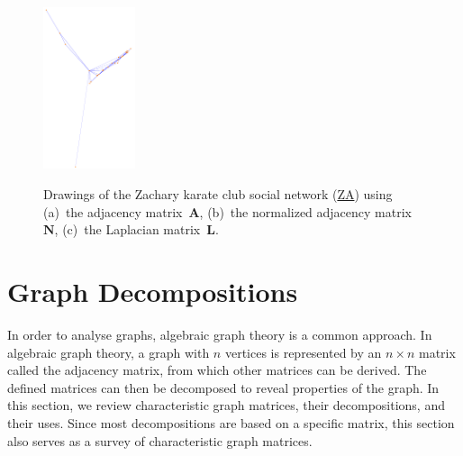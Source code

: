 \documentclass{article}
\newcommand{\wFour}{0.24\textwidth}
\begin{document}
\begin{figure}
{    \includegraphics[width=\wFour]{plot/map.ax.lap.ucidata-zachary}}
  \caption{ Drawings of the Zachary karate club social network
    (\href{http://konect.uni-koblenz.de/networks/ucidata-zachary}{\textsf{ZA}})
    using (a)~the adjacency matrix~$\mathbf A$, (b)~the normalized
    adjacency matrix~$\mathbf N$, (c)~the Laplacian matrix~$\mathbf L$.
    \label{fig:map.ax}
  }
\end{figure}

\section{Graph Decompositions}
\label{sec:matrix}
In order to analyse graphs, algebraic graph theory is a common
approach.  In algebraic graph theory, a graph with $n$ vertices is
represented by an $n\times n$ matrix called the adjacency matrix, from
which other matrices can be derived.  The defined matrices can then be
decomposed to reveal properties of the graph. 
In this section, we review characteristic graph matrices, their
decompositions, and their uses.  Since most decompositions are based on
a specific matrix, this section also serves as a survey of
characteristic graph matrices.  
\end{document}
